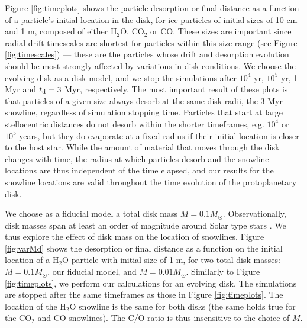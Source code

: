 \documentclass[apj]{emulateapj}
\begin{document}
Figure \ref{fig:timeplots} shows the particle desorption or final distance as a function of a particle's initial location in the disk, for ice particles %
of initial sizes of 10 cm and 1 m, composed of either H$_2$O, CO$_2$ or CO. These sizes are important since radial drift timescales are shortest for particles within this size range (see Figure \ref{fig:timescales}) --- these are the particles whose drift and desorption evolution should be most strongly affected by variations in disk conditions. We choose the evolving disk as a disk model, and we stop the simulations after $10^4$ yr, $10^5$ yr, 1 Myr and $t_{\rm d}=3$ Myr, respectively. %
The most important result of these plots is that particles of a given size always desorb at the same disk radii, the 3 Myr snowline, regardless of simulation stopping time.  Particles %
that start at large stellocentric distances do not desorb within the shorter timeframes, e.g. $10^4$ or $10^5$ years, but they do evaporate at a fixed radius if their initial location is closer to the host star. While the amount of material that moves through the disk changes with time, the radius at which particles desorb and 
the snowline locations are thus independent of the time elapsed, and %
our results for the snowline locations are %
valid throughout the time evolution of the protoplanetary disk. 

We choose as a fiducial model a total disk mass $M=0.1 M_{\odot}$. Observationally, disk masses span at least an order of magnitude around Solar type stars %
\citep{andrews13}. %
We thus explore the effect of disk mass on the location of snowlines. Figure \ref{fig:varMd} shows the desorption or final distance as a function on the initial location of a H$_2$O particle with initial size of 1 m, for two total disk masses: $M=0.1 M_{\odot}$, our fiducial model, and $M=0.01 M_{\odot}$. Similarly to Figure \ref{fig:timeplots}, we perform our calculations for an evolving disk. The simulations are stopped after the same timeframes as those in Figure \ref{fig:timeplots}. The location of the H$_2$O snowline is the same for both disks (the same holds true for the CO$_2$ and CO snowlines). The C/O ratio is thus insensitive to the choice of $M$. %
\end{document}
